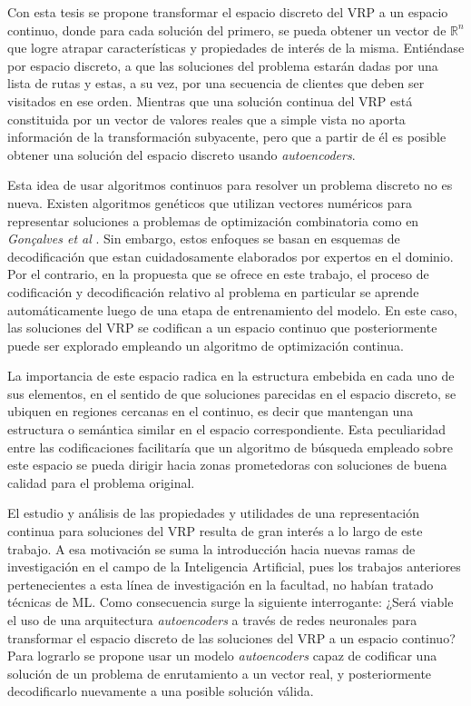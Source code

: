 Con esta tesis se propone transformar el espacio discreto del VRP a un espacio continuo, donde para cada solución del primero, se pueda obtener un vector de $\mathbb{R}^n$ que logre atrapar características y propiedades de interés de la misma. Entiéndase por espacio discreto, a que las soluciones del problema estarán dadas por una lista de rutas y estas, a su vez, por una secuencia de clientes que deben ser visitados en ese orden. Mientras que una solución continua del VRP está constituida por un vector de valores reales que a simple vista no aporta información de la transformación subyacente, pero que a partir de él es posible obtener una solución del espacio discreto usando \textit{autoencoders}.

Esta idea de usar algoritmos continuos para resolver un problema discreto no es nueva. Existen algoritmos genéticos que utilizan vectores numéricos para representar soluciones a problemas de optimización combinatoria como en \textit{Gon{\c{c}}alves et al} \cite{GoncalvesGenAlg}. Sin embargo, estos enfoques se basan en esquemas de decodificación que estan cuidadosamente elaborados por expertos en el dominio. Por el contrario, en la propuesta que se ofrece en este trabajo, el proceso de codificación y decodificación relativo al problema en particular se aprende automáticamente luego de una etapa de entrenamiento del modelo. En este caso, las soluciones del VRP se codifican a un espacio continuo que posteriormente puede ser explorado empleando un algoritmo de optimización continua.

La importancia de este espacio radica en la estructura embebida en cada uno de sus elementos, en el sentido de que soluciones parecidas en el espacio discreto, se ubiquen en regiones cercanas en el continuo, es decir que mantengan una estructura o semántica similar en el espacio correspondiente. Esta peculiaridad entre las codificaciones facilitaría que un algoritmo de búsqueda empleado sobre este espacio se pueda dirigir hacia zonas prometedoras con soluciones de buena calidad para el problema original. 

El estudio y análisis de las propiedades y utilidades de una representación continua para soluciones del VRP resulta de gran interés a lo largo de este trabajo. A esa motivación se suma la introducción hacia nuevas ramas de investigación en el campo de la Inteligencia Artificial, pues los trabajos anteriores pertenecientes a esta línea de investigación en la facultad, no habían tratado técnicas de ML. Como consecuencia surge la siguiente interrogante: ¿Será viable el uso de una arquitectura  \textit{autoencoders} a través de redes neuronales para transformar el espacio discreto de las soluciones del VRP a un espacio continuo? Para lograrlo se propone usar un modelo \textit{autoencoders} capaz de codificar una solución de un problema de enrutamiento a un vector real, y posteriormente decodificarlo nuevamente a una posible solución válida.

